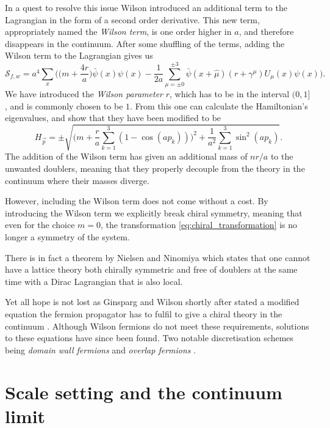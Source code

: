 In a quest to resolve this issue Wilson introduced an additional term to the
Lagrangian in the form of a second order derivative. This new term,
appropriately named the \emph{Wilson term}, is one order higher in $a$, and therefore
disappears in the continuum. After some shuffling of the terms, adding the
Wilson term to the Lagrangian gives us
%
\begin{equation} \label{eq:wilson_action}
  \mathcal{S}_{f,w} = a^4 \sum_{x} \bigg(
  \big(m + {\textstyle\frac{4 r}{a}}\big) \bar{\psi}(x) \psi(x)
  - \frac{1}{2a} \sum_{\mu = \pm 0}^{\pm 3} \bar{\psi}(x+\hat{\mu}) (r +
  \gamma^{\mu}) U_{\mu}(x) \psi(x) \bigg).
\end{equation}
%
We have introduced the \emph{Wilson parameter} $r$, which has to be in the
interval $(0, 1]$, and is commonly chosen to be $1$. From this one can calculate
the Hamiltonian's eigenvalues, and show that they have been modified to be
%
\begin{equation}
  H_{\vec{p}} = \pm \sqrt{\bigg(m + \frac{r}{a}\sum_{k=1}^3 (1 - \cos (a p_k) ) \bigg)^2
    + \frac{1}{a^2} \sum_{k=1}^3 \sin^2 (a p_k)}.
\end{equation}
%
The addition of the Wilson term has given an additional mass of $n r/a$ to the
unwanted doublers, meaning that they properly decouple from the theory in the
continuum where their masses diverge. 

However, including the Wilson term does not come without a cost. By introducing
the Wilson term we explicitly break chiral symmetry, meaning that even for the
choice $m=0$, the transformation \eqref{eq:chiral_transformation} is no longer a
symmetry of the system. 

There is in fact a theorem by Nielsen and Ninomiya
\citep{Nielsen:1980rz,Nielsen:1981xu} which states that one cannot have a lattice
theory both chirally symmetric and free of doublers at the same time with a
Dirac Lagrangian that is also local.

Yet all hope is not lost as Ginsparg and Wilson shortly after stated a modified
equation the fermion propagator has to fulfil to give a chiral theory in the
continuum \citep{Ginsparg:1981bj}. Although Wilson fermions do not meet these
requirements, solutions to these equations have since been found. Two notable
discretisation schemes being \emph{domain wall fermions} \citep{Kaplan:1992bt} and 
\emph{overlap fermions} \citep{Neuberger:1997fp,Neuberger:1998wv}.

\section{Scale setting and the continuum limit} \label{sec:scale_setting}

